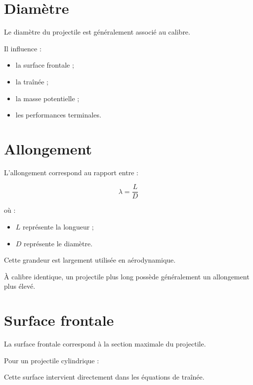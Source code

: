 \section{Diamètre}

Le diamètre du projectile est généralement associé au calibre.

Il influence :

\begin{itemize}
    \item la surface frontale ;
    \item la traînée ;
    \item la masse potentielle ;
    \item les performances terminales.
\end{itemize}

\section{Allongement}

L'allongement correspond au rapport entre :

\begin{equation}
\lambda=\frac{L}{D}
\end{equation}

où :

\begin{itemize}
    \item $L$ représente la longueur ;
    \item $D$ représente le diamètre.
\end{itemize}

Cette grandeur est largement utilisée en aérodynamique.

\begin{aretenir}

À calibre identique, un projectile plus long possède généralement un
allongement plus élevé.

\end{aretenir}

\section{Surface frontale}

La surface frontale correspond à la section maximale du projectile.

Pour un projectile cylindrique :



Cette surface intervient directement dans les équations de traînée.

